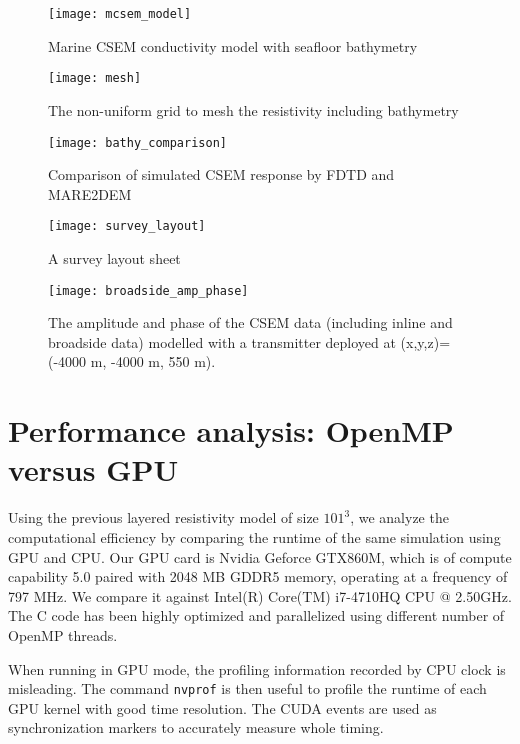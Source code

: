 \documentclass[a4paper,10pt]{article}
\begin{document}
\begin{figure}[!htb]
  \centering
  \texttt{[image: mcsem\_model]}
  \caption{Marine CSEM conductivity model with seafloor bathymetry}\label{fig:mcsemmodel}
\end{figure}


\begin{figure}[!htb]
  \centering
  \texttt{[image: mesh]}
  \caption{The non-uniform grid to mesh the resistivity including bathymetry}\label{fig:mesh}
\end{figure}

\begin{figure}[!htb]
  \centering
  \texttt{[image: bathy\_comparison]}
  \caption{Comparison of simulated CSEM response by FDTD and MARE2DEM}\label{fig:bathycomparison}
\end{figure}


\begin{figure}[!htb]
  \centering
  \texttt{[image: survey\_layout]}
  \caption{A survey layout sheet}\label{fig:surveylayout}
\end{figure}

\begin{figure}[!htb]
  \centering
  \texttt{[image: broadside\_amp\_phase]}
  \caption{The amplitude and phase of the CSEM data (including inline and broadside data) modelled with a transmitter deployed at (x,y,z)=(-4000 m, -4000 m, 550 m).}\label{fig:broadside}
\end{figure}



\section{Performance analysis: OpenMP versus GPU}


Using the previous layered resistivity model of size $101^3$, we analyze the computational efficiency by comparing the runtime of the same simulation using GPU and CPU. Our GPU card is Nvidia Geforce GTX860M, which is of compute capability 5.0 paired with 2048 MB GDDR5 memory, operating at a frequency of 797 MHz. 
We compare it against Intel(R) Core(TM) i7-4710HQ CPU @ 2.50GHz.  The C code has been highly optimized and parallelized using different number of OpenMP threads.

When running in GPU mode, the profiling information recorded by CPU clock is misleading.
The command \verb|nvprof| is then useful to profile the runtime of each GPU kernel with good time resolution. The CUDA events are used as synchronization markers to accurately measure whole timing. 
\end{document}
